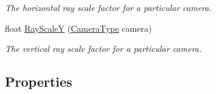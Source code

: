 \begin{DoxyCompactItemize}
\begin{DoxyCompactList}\small\item\em The horizontal ray scale factor for a particular camera. \end{DoxyCompactList}\item 
float \mbox{\hyperlink{class_leap_1_1_image_a9d5749a8512e3c14d48cf54d6e00140a}{Ray\+ScaleY}} (\mbox{\hyperlink{class_leap_1_1_image_a28310e43e0f2d7f7117e1b45330bdc38}{Camera\+Type}} camera)
\begin{DoxyCompactList}\small\item\em The vertical ray scale factor for a particular camera. \end{DoxyCompactList}\end{DoxyCompactItemize}
\subsection*{Properties}
